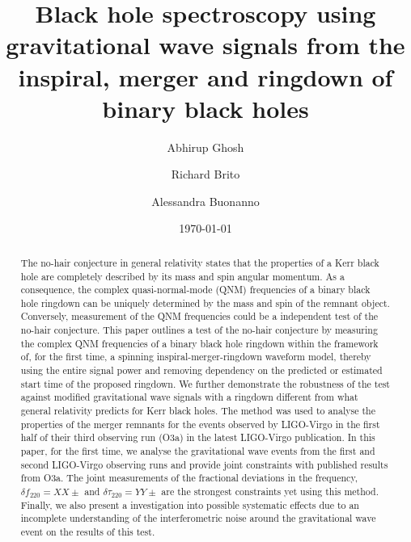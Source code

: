 \documentclass[twocolumn,prd,superscriptaddress,amsfonts,amssymb,amsmath,preprintnumbers]{revtex4-1}
\newcommand{\df}[1]{\delta f_{\text{#1}}}
\newcommand{\dt}[1]{\delta \tau_{\text{#1}}}
\begin{document}
\title{Black hole spectroscopy using gravitational wave signals from the inspiral, merger and ringdown of binary black holes}

\author{Abhirup Ghosh}
\author{Richard Brito}
\author{Alessandra Buonanno}

\date{\today}


\begin{abstract}
The no-hair conjecture in general relativity states that the properties of a Kerr black hole are completely described by its mass and spin angular momentum. As a consequence, the complex quasi-normal-mode (QNM) frequencies of a binary black hole ringdown can be uniquely determined by the mass and spin of the remnant object. Conversely, measurement of the QNM frequencies could be a independent test of the no-hair conjecture. This paper outlines a test of the no-hair conjecture by measuring the complex QNM frequencies of a binary black hole ringdown within the framework of, for the first time, a spinning inspiral-merger-ringdown waveform model, thereby using the entire signal power and removing dependency on the predicted or estimated start time of the proposed ringdown. We further demonstrate the robustness of the test against modified gravitational wave signals with a ringdown different from what general relativity predicts for Kerr black holes. The method was used to analyse the properties of the merger remnants for the events observed by LIGO-Virgo in the first half of their third observing run (O3a) in the latest LIGO-Virgo publication. In this paper, for the first time, we analyse the gravitational wave events from the first and second LIGO-Virgo observing runs and provide joint constraints with published results from O3a. The joint measurements of the fractional deviations in the frequency, $\df{220} = XX \pm$ and $\dt{220} = YY \pm$ are the strongest constraints yet using this method. Finally, we also present a investigation into possible systematic effects due to an incomplete understanding of the interferometric noise around the gravitational wave event on the results of this test.
\end{abstract}
\end{document}
